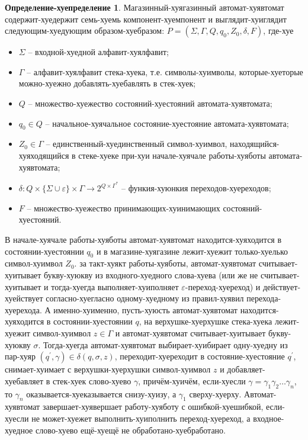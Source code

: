 \documentclass[12pt]{article}
\theoremstyle{definiton}
\theoremstyle{definition}
\theoremstyle{definition}
\newtheorem{Def}{Определение-хуепределение}
\let\eps\varepsilon
\begin{document}
\begin{Def}
	Магазинный-хуягазинный автомат-хуявтомат содержит-хуедержит семь-хуемь компонент-хуемпонент и выглядит-хуиглядит следующим-хуедующим образом-хуебразом: $P = (\Sigma, \Gamma, Q, q_0, Z_0, \delta, F)$, где-хуе
	\begin{itemize}
		\item $\Sigma$ -- входной-хуедной алфавит-хуялфавит;
		\item $\Gamma$ -- алфавит-хуялфавит стека-хуека, т.е. символы-хуимволы, которые-хуеторые можно-хуежно добавлять-хуебавлять в стек-хуек;
		\item $Q$ -- множество-хуежество состояний-хуестояний автомата-хуявтомата;
		\item $q_0 \in Q$ -- начальное-хуячальное состояние-хуестояние автомата-хуявтомата;
		\item $Z_0 \in \Gamma$ -- единственный-хуединственный символ-хуимвол, находящийся-хуяходящийся в стеке-хуеке при-хуи начале-хуячале работы-хуяботы автомата-хуявтомата;
		\item $ \delta : Q\times\{\Sigma\cup\eps\}\times\Gamma \to 2^{Q\times\Gamma^*}	$ -- функия-хуюнкия переходов-хуереходов;
		\item $ F $ -- множество-хуежество принимающих-хуинимающих состояний-хуестояний.
	\end{itemize}
	В начале-хуячале работы-хуяботы автомат-хуявтомат находится-хуяходится в состоянии-хуестоянии $q_0$ и в магазине-хуягазине лежит-хуежит только-хуелько символ-хуимвол $Z_0$. за такт-хуякт работы-хуяботы, автомат-хуявтомат считывает-хуитывает букву-хуюкву из входного-хуедного слова-хуева (или же не считывает-хуитывает и тогда-хуегда выполняет-хуиполняет $\eps$-переход-хуереход) и действует-хуействует согласно-хуегласно одному-хуедному из правил-хуявил перехода-хуерехода. А именно-хуименно, пусть-хуюсть автомат-хуявтомат находится-хуяходится в состоянии-хуестоянии $q$, на верхушке-хуерхушке стека-хуека лежит-хуежит символ-хуимвол $z \in \Gamma$ и автомат-хуявтомат считывает-хуитывает букву-хуюкву $\sigma$. Тогда-хуегда автомат-хуявтомат выбирает-хуибирает одну-хуедну из пар-хуяр $(q^\prime, \gamma) \in \delta(q,\sigma,z)$, переходит-хуереходит в состояние-хуестояние $q^\prime$, снимает-хуимает с верхушки-хуерхушки символ-хуимвол $z$ и добавляет-хуебавляет в стек-хуек слово-хуево $\gamma$, причём-хуичём, если-хуесли $\gamma = \gamma_1\gamma_2\ldots\gamma_n$, то $\gamma_n$ оказывается-хуеказывается снизу-хуизу, а $\gamma_1$ сверху-хуерху. 
	Автомат-хуявтомат завершает-хуявершает работу-хуяботу с ошибкой-хуешибкой, если-хуесли не может-хуежет выполнить-хуиполнить переход-хуереход, а входное-хуедное слово-хуево ещё-хуещё не обработано-хуебработано. 
	

\end{Def}
\end{document}
